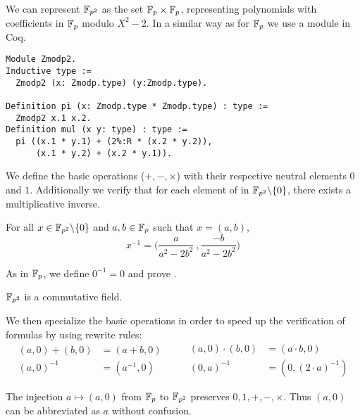 We can represent $\mathbb{F}_{p^2}$ as the set $\mathbb{F}_{p} \times \mathbb{F}_{p}$,
representing polynomials with coefficients in $\mathbb{F}_{p}$ modulo $X^2 - 2$. In a similar way
as for $\mathbb{F}_{p}$ we use a module in Coq.
\begin{lstlisting}[language=Coq,belowskip=-0.25 \baselineskip]
Module Zmodp2.
Inductive type :=
  Zmodp2 (x: Zmodp.type) (y:Zmodp.type).

Definition pi (x: Zmodp.type * Zmodp.type) : type :=
  Zmodp2 x.1 x.2.
Definition mul (x y: type) : type :=
  pi ((x.1 * y.1) + (2%:R * (x.2 * y.2)),
      (x.1 * y.2) + (x.2 * y.1)).
\end{lstlisting}

We define the basic operations ($+, -, \times$) with their respective neutral
elements $0$ and $1$. Additionally we verify that for each element of in
$\mathbb{F}_{p^2}\backslash\{0\}$, there exists a multiplicative inverse.
\begin{lemma}
  \label{lemma:Zmodp2_inv}
  For all $x \in \mathbb{F}_{p^2}\backslash\{0\}$ and $a,b \in \mathbb{F}_{p}$ such that $x = (a,b)$,
  $$x^{-1} = \Big(\frac{a}{a^2-2b^2}\ , \frac{-b}{a^2-2b^2}\Big)$$
\end{lemma}
As in $\mathbb{F}_{p}$, we define $0^{-1} = 0$ and prove .
\begin{lemma}
  \label{lemma:Zmodp2_field}
  $\mathbb{F}_{p^2}$ is a commutative field.
\end{lemma}

We then specialize the basic operations in order to speed up the verification
of formulas by using rewrite rules:
\begin{equation*}
  \begin{split}
    (a,0) + (b,0) &= (a+b, 0)\\[-0.5ex]
    (a, 0)^{-1} &= (a^{-1}, 0)
  \end{split}
  \qquad
  \begin{split}
    (a,0) \cdot   (b,0) &= (a \cdot b, 0)\\[-0.5ex]
    (0,a)^{-1} &= (0,(2\cdot a)^{-1})
  \end{split}
\end{equation*}

The injection $a \mapsto (a,0)$ from $\mathbb{F}_{p}$ to $\mathbb{F}_{p^2}$ preserves
$0, 1, +, -, \times$. Thus $(a,0)$ can be abbreviated as $a$ without confusion.

